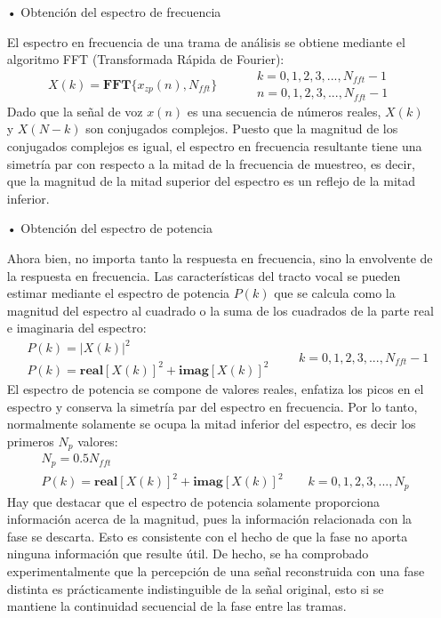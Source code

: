 \begin{enumerate}
\begin{enumerate}
\item[•]Obtención del espectro de frecuencia
\par
El espectro en frecuencia de una trama de análisis se obtiene mediante el algoritmo FFT (Transformada Rápida de Fourier):
\begin{equation}
\label{eq:ecuacion44}
X(k) = \mathbf{FFT}\{ x_{zp}(n), N_{fft} \}
\qquad
\begin{aligned}
& k = 0,1,2,3,...,N_{fft}-1 \\
& n = 0,1,2,3,...,N_{fft}-1
\end{aligned}
\end{equation}
Dado que la señal de voz $x(n)$ es una secuencia de números reales, $X(k)$ y $X(N - k)$ son conjugados complejos. Puesto que la magnitud de los conjugados complejos es igual, el espectro en frecuencia resultante tiene una simetría par con respecto a la mitad de la frecuencia de muestreo, es decir, que la magnitud de la mitad superior del espectro es un reflejo de la mitad inferior.

\item[•]Obtención del espectro de potencia
\par
Ahora bien, no importa tanto la respuesta en frecuencia, sino la envolvente de la respuesta en frecuencia. Las características del tracto vocal se pueden estimar mediante el espectro de potencia $P(k)$ que se calcula como la magnitud del espectro al cuadrado o la suma de los cuadrados de la parte real e imaginaria del espectro:
\begin{equation}
\label{eq:ecuacion45}
\begin{aligned}
& P(k) = \left | X(k) \right |^{2} \\
& P(k) = \mathbf{real}[X(k)]^{2} + \mathbf{imag}[X(k)]^{2}
\end{aligned}
\qquad
k = 0,1,2,3,...,N_{fft}-1
\end{equation}
El espectro de potencia se compone de valores reales, enfatiza los picos en el espectro y conserva la simetría par del espectro en frecuencia. Por lo tanto, normalmente solamente se ocupa la mitad inferior del espectro, es decir los primeros $N_{p}$ valores:
\begin{equation}
\label{eq:ecuacion46}
\begin{aligned}
& N_{p} = 0.5N_{fft} \\
& P(k) = \mathbf{real}[X(k)]^{2} + \mathbf{imag}[X(k)]^{2} \qquad k = 0,1,2,3,...,N_{p}
\end{aligned}
\end{equation}
Hay que destacar que el espectro de potencia solamente proporciona información acerca de la magnitud, pues la información relacionada con la fase se descarta. Esto es consistente con el hecho de que la fase no aporta ninguna información que resulte útil. De hecho, se ha comprobado experimentalmente que la percepción de una señal reconstruida con una fase distinta es prácticamente indistinguible de la señal original, esto si se mantiene la continuidad secuencial de la fase entre las tramas.


\end{enumerate}
\end{enumerate}
